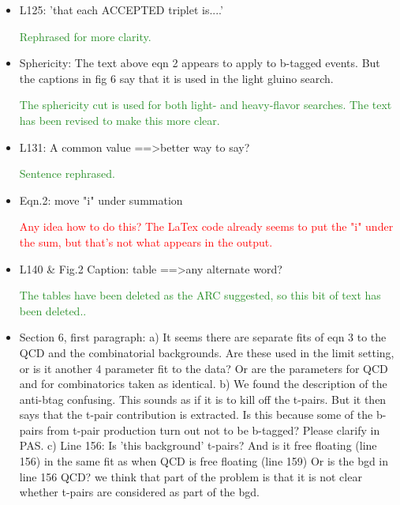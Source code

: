 \documentclass[paper=a4, fontsize=11pt]{scrartcl}
\begin{document}
\begin{itemize}
\item L125: 'that each ACCEPTED triplet is....' 

\textcolor{ForestGreen}{Rephrased for more clarity.}\\

\item Sphericity: 
The text above eqn 2 appears to apply to b-tagged events. But the captions 
in fig 6 say that it is used in the light gluino search. 

\textcolor{ForestGreen}{The sphericity cut is used for both light- and heavy-flavor searches.
The text has been revised to make this more clear.}\\

\item L131: 
A common value ==\textgreater better way to say? 

\textcolor{ForestGreen}{Sentence rephrased.}\\

\item Eqn.2: 
move "i" under summation 

\textcolor{Red}{Any idea how to do this? The LaTex code already seems to put the "i" under the sum, but that's not what appears in the output.}\\


\item L140 \& Fig.2 Caption: 
table ==\textgreater any alternate word? 

\textcolor{ForestGreen}{The tables have been deleted as the ARC suggested, so this bit
of text has been deleted..}\\

\item Section 6, first paragraph: 
a) It seems there are separate fits of eqn 3 to the QCD and the combinatorial 
backgrounds. Are these used in the limit setting, or is it another 4 
parameter fit to the data? Or are the parameters for QCD and for 
combinatorics taken as identical. 
b) We found the description of the anti-btag confusing. This sounds as if it 
is to kill off the t-pairs. But it then says that the t-pair contribution is 
extracted. Is this because some of the b-pairs from t-pair production turn 
out not to be b-tagged? Please clarify in PAS. 
c) Line 156: Is 'this background' t-pairs? And is it free floating (line 156) 
in the same fit as when QCD is free floating (line 159) {Or is the bgd in 
line 156 QCD?} 
{we think that part of the problem is that it is not clear whether t-pairs 
are considered as part of the bgd.} 


\end{itemize}
\end{document}
